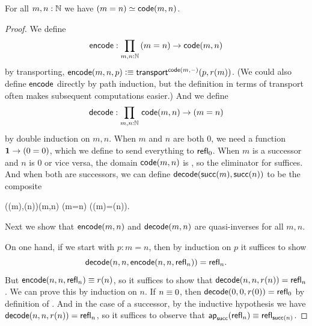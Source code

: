 \begin{thm}\label{thm:path-nat}
  For all $m,n:\mathbb{N}$ we have $(m=n) \simeq \mathsf{code}(m,n)$.
\end{thm}
\begin{proof}
  We define
  \[ \encode : \prd{m,n:\N} (m=n) \to \code(m,n) \]
  by transporting, $\mathsf{encode}(m,n,p) \vcentcolon\equiv \mathsf{transport}^{\mathsf{code}(m,{\mathord{\hspace{1pt}\text{--}\hspace{1pt}}})}(p,r(m))$.
  (We could also define $\mathsf{encode}$ directly by path induction, but the definition in terms of transport often makes subsequent computations easier.)
  And we define
  \[ \decode : \prd{m,n:\N} \code(m,n) \to (m=n) \]
  by double induction on $m,n$.
  When $m$ and $n$ are both $0$, we need a function $\mathbf{1} \to (0=0)$, which we define to send everything to $\mathsf{refl}_{0}$.
  When $m$ is a successor and $n$ is $0$ or vice versa, the domain $\mathsf{code}(m,n)$ is \emptyt, so the eliminator for \emptyt suffices.
  And when both are successors, we can define $\mathsf{decode}(\mathsf{succ}(m),\mathsf{succ}(n))$ to be the composite
  \begin{narrowmultline*}
    \code(\suc(m),\suc(n))\jdeq\code(m,n)
     \narrowbreak
    (m=n)
    \xrightarrow{\apfunc{\suc}}
    (\suc(m)=\suc(n)).
  \end{narrowmultline*}
  Next we show that $\mathsf{encode}(m,n)$ and $\mathsf{decode}(m,n)$ are quasi-inverses for all $m,n$.

  On one hand, if we start with $p:m=n$, then by induction on $p$ it suffices to show
  \[\mathsf{decode}(n,n,\mathsf{encode}(n,n,\mathsf{refl}_{n}))=\mathsf{refl}_{n}.\]
  But $\mathsf{encode}(n,n,\mathsf{refl}_{n}) \equiv r(n)$, so it suffices to show that $\mathsf{decode}(n,n,r(n)) =\mathsf{refl}_{n}$.
  We can prove this by induction on $n$.
  If $n\equiv 0$, then $\mathsf{decode}(0,0,r(0)) =\mathsf{refl}_{0}$ by definition of \decode.
  And in the case of a successor, by the inductive hypothesis we have $\mathsf{decode}(n,n,r(n)) = \mathsf{refl}_{n}$, so it suffices to observe that $\mathsf{ap}_{\mathsf{succ}}(\mathsf{refl}_{n}) \equiv \mathsf{refl}_{\mathsf{succ}(n)}$.


\end{proof}
